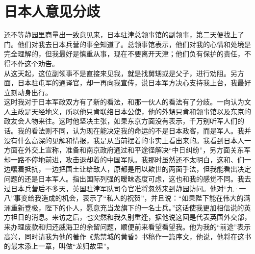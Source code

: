 \fancyhead[RO]{\thepage} %
\fancyhead[LE]{\thepage} %
\chapter*{日本人意见分歧}
还不等静园里商量出一致意见来，日本驻津总领事馆的副领事，第二天便找上了门。他们对我去日本兵营的事全知道了。总领事馆表示，他们对我的心情和处境是完全理解的，但我最好是慎重从事，现在不要离开天津；他们负有保护的责任，不得不作这个劝告。\\

从这天起，这位副领事不是直接来见我，就是找舅甥或是父子，进行劝阻。另方面，日本驻屯军的通译官，却一再向我宣传，说日本军方决心支持我上台，我最好立刻动身出行。\\

这时我对于日本军政双方有了新的看法，和那一伙人的看法有了分歧。一向认为文人主政是天经地义，所以他只肯联络日本公使，他的外甥只肯和领事馆以及东京的政友会人物来往。这时他坚决主张，如果东京方面没有表示，千万别听军人们的话。我的看法则不同，认为现在能决定我的命运的不是日本政客，而是军人。我并没有什么高深的见解和情报，我是从当前摆着的事实上看出来的。我看到日本人一方面在外交上宣称，准备和南京政府通过和平途径解决“中日纠纷”，另方面关东军却一路不停地前进，攻击退却着的中国军队。我那时虽然还不太明白，这和、们一边嚷着抵抗，一边把国土让给敌人，原都是用以欺世的两面手法，但我能看出决定问题的还是日本军人。指出国际列强的暧昧态度可虑，这也和我的感觉不同。我去过日本兵营后不多天，英国驻津军队司令官准将忽然来到静园访问。他对“九·一八”事变给我造成的机会，表示了“私人的祝贺”，并且说：“如果陛下能在伟大的满洲重新登极，陛下的仆人，愿意充当龙旗下的一名士兵。”这话使我更加相信说的英方袒日的消息。来访之后，也突然和我久别重逢，据他说这回是代表英国外交部，来办理废款和归还威海卫的余留问题，顺便前来看望看望我。他为我的“前途”表示高兴，同时请我为他的著作《紫禁城的黄昏》书稿作一篇序文，他说，他将在这书的最末添上一章，叫做“龙归故里”。\\


